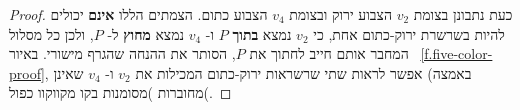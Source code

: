\begin{proof}
כעת נתבונן בצומת
$v_2$
הצבוע ירוק ובצומת
$v_4$
הצבוע כתום. הצמתים הללו 
\textbf{אינם}
יכולים להיות בשרשרת ירוק-כתום אחת, כי 
$v_2$
נמצא 
\textbf{בתוך}
$P$
ו-%
$v_4$
נמצא
\textbf{מחוץ}
ל-%
$P$,
ולכן כל מסלול המחבר אותם חייב לחתוך את
$P$,
הסותר את ההנחה שהגרף מישורי.
באיור%
~\ref{f.five-color-proof}, באמצה)
אפשר לראות שתי שרשראות ירוק-כתום המכילות את
$v_2$
ו-%
$v_4$
שאינן מחוברות )מסומנות בקו מקווקוו כפול(.
%
%
%
%  
%
%


\end{proof}
